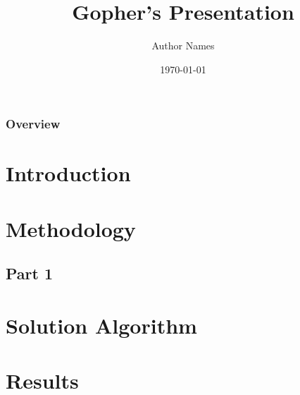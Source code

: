 \documentclass[11pt,xcolor=dvipsnames]{beamer}
\title[Presentation Topic]{Gopher's Presentation} %
\author{Author Names}
\institute[U of M]{University of Minnesota}
\date{\today} %
\begin{document}
\begin{frame}
\titlepage %
\end{frame}

\begin{frame}
\frametitle{Overview} %
\tableofcontents %
\end{frame}


\section{Introduction} %
\section{Methodology} %
	\subsection{Part 1} %
\section{Solution Algorithm}
\section{Results}
\end{document}
